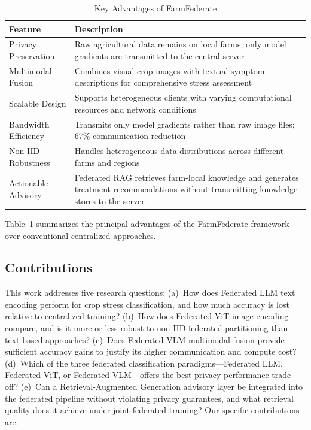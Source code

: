 \documentclass[10pt,journal,compsoc]{IEEEtran}
\begin{document}
\begin{table}[htbp]
\centering
\caption{Key Advantages of FarmFederate}
\label{tab:advantages}
\small
\begin{tabular}{p{2.2cm}p{5.3cm}}
\toprule
\textbf{Feature} & \textbf{Description} \\
\midrule
Privacy Preservation & Raw agricultural data remains on local farms; only model gradients are transmitted to the central server \\
\midrule
Multimodal Fusion & Combines visual crop images with textual symptom descriptions for comprehensive stress assessment \\
\midrule
Scalable Design & Supports heterogeneous clients with varying computational resources and network conditions \\
\midrule
Bandwidth Efficiency & Transmits only model gradients rather than raw image files; 67\% communication reduction \\
\midrule
Non-IID Robustness & Handles heterogeneous data distributions across different farms and regions \\
\midrule
Actionable Advisory & Federated RAG retrieves farm-local knowledge and generates treatment recommendations without transmitting knowledge stores to the server \\
\bottomrule
\end{tabular}
\end{table}

Table~\ref{tab:advantages} summarizes the principal advantages of the FarmFederate framework over conventional centralized approaches.

\subsection{Contributions}
This work addresses five research questions: (a)~How does Federated LLM text encoding perform for crop stress classification, and how much accuracy is lost relative to centralized training? (b)~How does Federated ViT image encoding compare, and is it more or less robust to non-IID federated partitioning than text-based approaches? (c)~Does Federated VLM multimodal fusion provide sufficient accuracy gains to justify its higher communication and compute cost? (d)~Which of the three federated classification paradigms---Federated LLM, Federated ViT, or Federated VLM---offers the best privacy-performance trade-off? (e)~Can a Retrieval-Augmented Generation advisory layer be integrated into the federated pipeline without violating privacy guarantees, and what retrieval quality does it achieve under joint federated training? Our specific contributions are:
\end{document}
